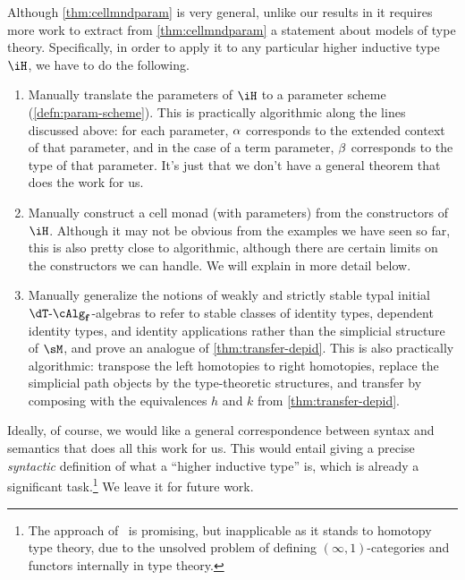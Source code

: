 \begin{enumerate}
\begin{enumerate}
Although \cref{thm:cellmndparam} is very general, unlike our results in  it requires more work to extract from \cref{thm:cellmndparam} a statement about models of type theory.
Specifically, in order to apply it to any particular higher inductive type $\iH$, we have to do the following.
\begin{enumerate}
\item Manually translate the parameters of $\iH$ to a parameter scheme (\cref{defn:param-scheme}).
  This is practically algorithmic along the lines discussed above: for each parameter, $\alpha$ corresponds to the extended context of that parameter, and in the case of a term parameter, $\beta$ corresponds to the type of that parameter.
  It's just that we don't have a general theorem that does the work for us.
\item Manually construct a cell monad \dT (with parameters) from the constructors of $\iH$.
  Although it may not be obvious from the examples we have seen so far, this is also pretty close to algorithmic, although there are certain limits on the constructors we can handle.
  We will explain in more detail below.\label{item:hit-mnd}
\item Manually generalize the notions of weakly and strictly stable typal initial $\dT\algf$-algebras to refer to stable classes of identity types, dependent identity types, and identity applications rather than the simplicial structure of $\sM$, and prove an analogue of \cref{thm:transfer-depid}.
  This is also practically algorithmic: transpose the left homotopies to right homotopies, replace the simplicial path objects by the type-theoretic structures, and transfer by composing with the equivalences $h$ and $k$ from \cref{thm:transfer-depid}.
\end{enumerate}
Ideally, of course, we would like a general correspondence between syntax and semantics that does all this work for us.
This would entail giving a precise \emph{syntactic} definition of what a ``higher inductive type'' is, which is already a significant task.\footnote{The approach of~\cite{acdf:qiits} is promising, but inapplicable as it stands to homotopy type theory, due to the unsolved problem of defining $(\infty,1)$-categories and functors internally in type theory.}
We leave it for future work.


\end{enumerate}
\end{enumerate}
